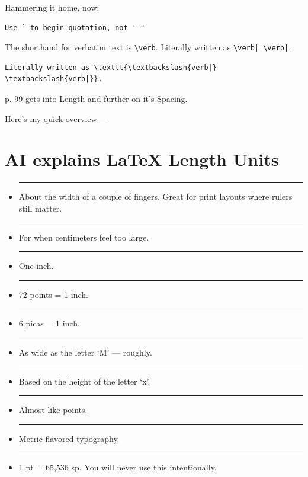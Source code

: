 \documentclass[10pt|draft]{report}
\begin{document}
Hammering it home, now:
\begin{verbatim}
Use ` to begin quotation, not ' "
\end{verbatim}

The shorthand for verbatim text is \verb|\verb|. 
Literally written as \texttt{\textbackslash{verb|} \textbackslash{verb|}}.

\begin{verbatim}
Literally written as \texttt{\textbackslash{verb|} \textbackslash{verb|}}.
\end{verbatim}

p. 99 gets into Length and further on it's Spacing.

Here's my quick overview---\\
\section*{AI explains \LaTeX{} Length Units}

\begin{itemize}

  \item[\texttt{cm}]
  \rule{3cm}{1pt}
  About the width of a couple of fingers.
  Great for print layouts where rulers still matter.

  \item[\texttt{mm}]
  \rule{10mm}{1pt}
  For when centimeters feel too large.

  \item[\texttt{in}]
  \rule{1in}{1pt}
  One inch.

  \item[\texttt{pt}]
  \rule{72pt}{1pt}
  72 points = 1 inch.

  \item[\texttt{pc}]
  \rule{6pc}{1pt}
  6 picas = 1 inch.

  \item[\texttt{em}]
  \rule{5em}{1pt}
  As wide as the letter ‘M’ — roughly.

  \item[\texttt{ex}]
  \rule{10ex}{1pt}
  Based on the height of the letter ‘x’.

  \item[\texttt{bp}]
  \rule{72bp}{1pt}
  Almost like points.

  \item[\texttt{dd}]
  \rule{10dd}{1pt}
  Metric-flavored typography.

  \item[\texttt{sp}]
  \rule{65536sp}{1pt}
  1 pt = 65,536 sp.
  You will never use this intentionally.

\end{itemize}
\end{document}
